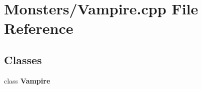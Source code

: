 \section{Monsters/\-Vampire.cpp File Reference}
\label{_vampire_8cpp}
\subsection*{Classes}
\begin{DoxyCompactItemize}
\item 
class {\bf Vampire}
\end{DoxyCompactItemize}
